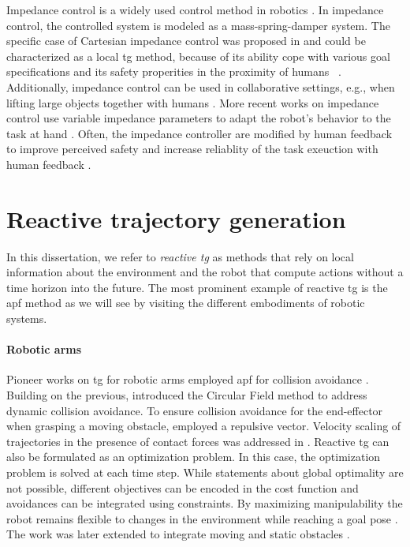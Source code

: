 Impedance control is a widely used control method in
robotics \cite{hogan1985impedance,abu2020variable}. In impedance
control, the controlled system is modeled as a
mass-spring-damper system. The specific case of Cartesian
impedance control was proposed in \cite{albu2002cartesian} and
could be characterized as a local \ac{tg} method, because of
its ability cope with various goal specifications and its
safety properities in the proximity of humans
~\cite{van2022disagreement,hjorth2024enabling}.
Additionally, impedance control can be used in collaborative
settings, e.g., when lifting large objects together with
humans \cite{abu2020variable}. More recent works on
impedance control use variable impedance parameters to adapt
the robot's behavior to the task at hand
\cite{abu2020variable}. Often, the impedance controller are
modified by human feedback to improve perceived safety and
increase reliablity of the task exeuction with human
feedback \cite{lachner2022shaping,franzese2021ilosa}.

\section{Reactive trajectory generation}%
\label{sec:reactive_trajectory_generation}

In this dissertation, we refer to \textit{reactive \ac{tg}}
as methods that rely on local information about the
environment and the robot that compute actions without a
time horizon into the future. The most prominent example of
reactive \ac{tg} is the \ac{apf} method as we will
see by visiting the different embodiments of robotic
systems.

\paragraph{Robotic arms}

Pioneer works on \ac{tg} for robotic arms
employed \ac{apf} for collision avoidance
\cite{Khatib1985,khatib1986real,park2008movement}. Building
on the previous, \cite{Haddadin2011} introduced the Circular
Field method to address dynamic collision avoidance. To
ensure collision avoidance for the end-effector when
grasping a moving obstacle, \cite{Du2018} employed a
repulsive vector.
Velocity scaling of trajectories in the presence of 
contact forces was addressed in \cite{haddadin2010real}.
Reactive \ac{tg} can also be formulated as an optimization
problem. In this case, the optimization problem is solved
at each time step. While statements about global optimality
are not possible, different objectives can be encoded in the
cost function and avoidances can be integrated using
constraints. By maximizing manipulability the robot remains
flexible to changes in the environment while reaching a goal
pose \cite{haviland2020purely}. The work was later extended
to integrate moving and static obstacles
\cite{haviland2021neo}.

